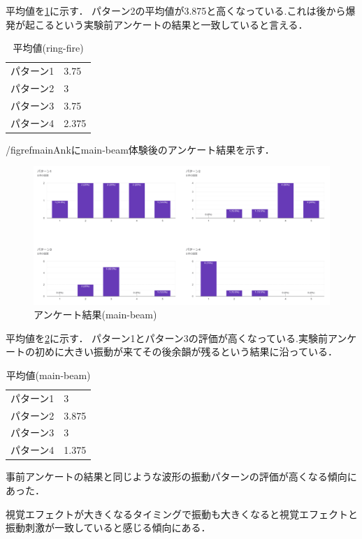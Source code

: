 平均値を\ref{tab;ringAve}に示す．
パターン2の平均値が3.875と高くなっている.これは後から爆発が起こるという実験前アンケートの結果と一致していると言える．

\begin{table}[H]
    \caption{平均値(ring-fire)}
    \centering
    \begin{tabular}{l|l}
    \hline
    \hline
    パターン1 & 3.75\\
    パターン2 & 3\\
    パターン3 & 3.75\\
    パターン4 & 2.375\\
    \hline
    \end{tabular}
    \label{tab;ringAve}
\end{table}

\newpage
/figref{mainAnk}にmain-beam体験後のアンケート結果を示す．

\begin{figure}[h]
  \centering
  \includegraphics[clip,width=14cm]{fig/mainbeamAnk.png}
  \caption{アンケート結果(main-beam)}\label{mainAnk}
  \end{figure}


平均値を\ref{tab;mainAve}に示す．
パターン1とパターン3の評価が高くなっている.実験前アンケートの初めに大きい振動が来てその後余韻が残るという結果に沿っている．

  \begin{table}[H]
    \caption{平均値(main-beam)}
    \centering
    \begin{tabular}{l|l}
    \hline
    \hline
    パターン1 & 3\\
    パターン2 & 3.875\\
    パターン3 & 3\\
    パターン4 & 1.375\\
    \hline
    \end{tabular}
    \label{tab;mainAve}
\end{table}

事前アンケートの結果と同じような波形の振動パターンの評価が高くなる傾向にあった．

視覚エフェクトが大きくなるタイミングで振動も大きくなると視覚エフェクトと振動刺激が一致していると感じる傾向にある．


